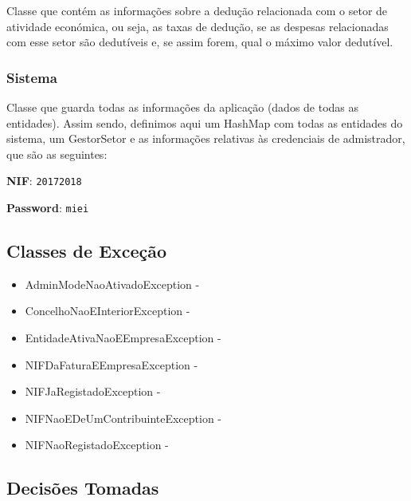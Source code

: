 \documentclass[a4paper]{article}
\begin{document}
Classe que contém as informações sobre a dedução relacionada com o setor de atividade económica, ou seja, as taxas de dedução, se as despesas relacionadas com esse setor são dedutíveis e, se assim forem, qual o máximo valor dedutível.


\subsubsection{Sistema} %

Classe que guarda todas as informações da aplicação (dados de todas as entidades). Assim sendo, definimos aqui um HashMap com todas as entidades do sistema, um GestorSetor e as informações relativas às credenciais de admistrador, que são as seguintes:

\textbf{NIF}: \texttt{20172018}

\textbf{Password}: \texttt{miei}



\subsection{Classes de Exceção}
\label{exceptions}

  \begin{itemize}
  	\item{AdminModeNaoAtivadoException - } 
    \item{ConcelhoNaoEInteriorException - } 
    \item{EntidadeAtivaNaoEEmpresaException - } 
    \item{NIFDaFaturaEEmpresaException - }
    \item{NIFJaRegistadoException - } 
    \item{NIFNaoEDeUmContribuinteException - }
    \item{NIFNaoRegistadoException - }
  \end{itemize}


\subsection{Decisões Tomadas}
\label{sec:decisoes}
\end{document}
